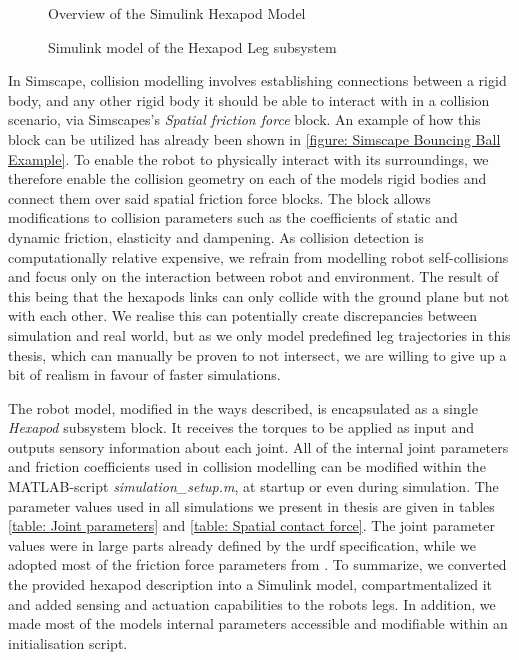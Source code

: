 \begin{figure}[h]
	\centerline{}
	\caption[Simulink hexapod model overview]{Overview of the Simulink Hexapod Model}
	\label{figure: Hexapod Model Overview}
\end{figure}

\begin{figure}
	\centerline{}
	\caption[Simulink leg subsystem]{Simulink model of the Hexapod Leg subsystem}
	\label{figure: Hexapod Leg}
\end{figure}

In Simscape, collision modelling involves establishing connections between a rigid body, and any other rigid body it should be able to interact with in a collision scenario, via Simscapes's \textit{Spatial friction force} block.
An example of how this block can be utilized has already been shown in \ref{figure: Simscape Bouncing Ball Example}.
To enable the robot to physically interact with its surroundings, we therefore  enable the collision geometry on each of the models rigid bodies and connect them over said spatial friction force blocks.
The block allows modifications to collision parameters such as the coefficients of static and dynamic friction, elasticity and dampening.
As collision detection is computationally relative expensive, we refrain from modelling robot self-collisions and focus only on the interaction between robot and environment.
The result of this being that the hexapods links can only collide with the ground plane but not with each other.
We realise this can potentially create discrepancies between simulation and real world, but as we only model predefined leg trajectories in this thesis, which can manually be proven to not intersect, we are willing to give up a bit of realism in favour of faster simulations.

The robot model, modified in the ways described, is encapsulated as a single \textit{Hexapod} subsystem block.
It receives the torques to be applied as input and outputs sensory information about each joint.
All of the internal joint parameters and friction coefficients used in collision modelling can be modified within the MATLAB-script \textit{simulation\_setup.m}, at startup or even during simulation.
The parameter values used in all simulations we present in thesis are given in tables \ref{table: Joint parameters} and \ref{table: Spatial contact force}.
The joint parameter values were in large parts already defined by the urdf specification, while we adopted most of the friction force parameters from \parencite{trotta2022walking}.
To summarize, we converted the provided hexapod description into a Simulink model, compartmentalized it and added sensing and actuation capabilities to the robots legs.
In addition, we made most of the models internal parameters accessible and modifiable within an initialisation script.



